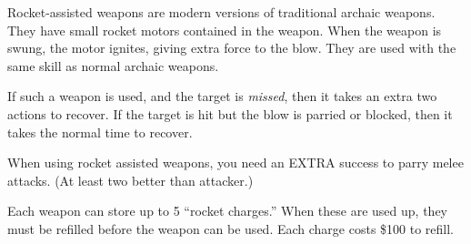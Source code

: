 Rocket-assisted weapons are modern versions of traditional archaic weapons.  They have small rocket motors contained in the weapon.	When the weapon is swung,  the motor ignites, giving extra force to the blow.  They are used with the same skill as normal archaic weapons.

If such a weapon is used, and the target is \emph{missed}, then it takes an extra two actions to recover.  If the target is hit but the blow	is parried or blocked, then it takes the normal time to recover.

When using rocket assisted weapons, you need an EXTRA success to parry melee attacks.  (At least two better than attacker.)

Each weapon can store up to 5 ``rocket charges.''  When these are used up, they must be refilled before the weapon can be used.	Each charge costs \$100 to refill.